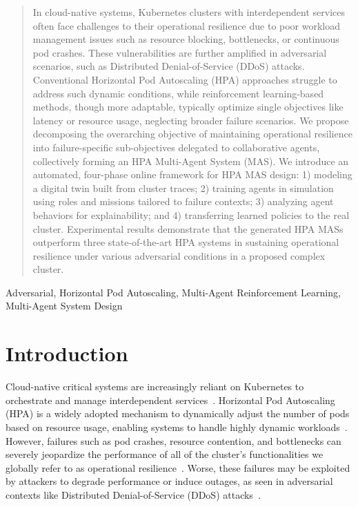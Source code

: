 \documentclass[conference]{IEEEtran}
\begin{document}
\maketitle

\begin{abstract}
    In cloud-native systems, Kubernetes clusters with interdependent services often face challenges to their operational resilience due to poor workload management issues such as resource blocking, bottlenecks, or continuous pod crashes. These vulnerabilities are further amplified in adversarial scenarios, such as Distributed Denial-of-Service (DDoS) attacks. Conventional Horizontal Pod Autoscaling (HPA) approaches struggle to address such dynamic conditions, while reinforcement learning-based methods, though more adaptable, typically optimize single objectives like latency or resource usage, neglecting broader failure scenarios.
    We propose decomposing the overarching objective of maintaining operational resilience into failure-specific sub-objectives delegated to collaborative agents, collectively forming an HPA Multi-Agent System (MAS). We introduce an automated, four-phase online framework for HPA MAS design: 1) modeling a digital twin built from cluster traces; 2) training agents in simulation using roles and missions tailored to failure contexts; 3) analyzing agent behaviors for explainability; and 4) transferring learned policies to the real cluster.
    Experimental results demonstrate that the generated HPA MASs outperform three state-of-the-art HPA systems in sustaining operational resilience under various adversarial conditions in a proposed complex cluster.

\end{abstract}

\begin{IEEEkeywords}
    Adversarial, Horizontal Pod Autoscaling, Multi-Agent Reinforcement Learning, Multi-Agent System Design
\end{IEEEkeywords}

\section{Introduction}
\label{sec:introduction}

Cloud-native critical systems are increasingly reliant on Kubernetes to orchestrate and manage interdependent services~\cite{Pahl2019}. Horizontal Pod Autoscaling (HPA) is a widely adopted mechanism to dynamically adjust the number of pods based on resource usage, enabling systems to handle highly dynamic workloads~\cite{Hohpe2012}. However, failures such as pod crashes, resource contention, and bottlenecks can severely jeopardize the performance of all of the cluster's functionalities we globally refer to as operational resilience~\cite{Burns2016}. Worse, these failures may be exploited by attackers to degrade performance or induce outages, as seen in adversarial contexts like Distributed Denial-of-Service (DDoS) attacks~\cite{Koller2019}.
\end{document}
